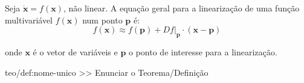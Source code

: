 {

\begin{mdframed}
    \noindent Seja $\pmb{\dot{x}} = f(\pmb{x})$, não linear. A equação geral para a linearização de uma função multivariável $f(\pmb{x})$ num ponto $\pmb{p}$ é:
    \vspace{-0.5em}
    $$
        f(\pmb{x}) \approx f(\pmb{p}) + \left.D f\right|_{\pmb{p}} \cdot (\pmb{x} - \pmb{p})
    $$
    
    \noindent onde $\pmb{x}$ é o vetor de variáveis e $\pmb{p}$ o ponto de interesse para a linearização.
\end{mdframed}
}

\begin{theo}{teo/def:nome-unico}\label{teo/def:nome-unico}
    >> Enunciar o Teorema/Definição
\end{theo}